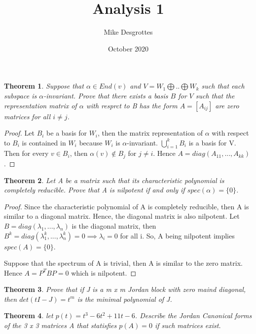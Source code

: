 \documentclass{article}
\title{Analysis 1}
\author{Mike Desgrottes}
\date{October 2020}
\theoremstyle{plain}
\newtheorem{theorem}{Theorem}
\theoremstyle{definition}
\begin{document}
\maketitle

\begin{theorem}
	Suppose that $\alpha \in End(v)$ and $V = W_{1}  \bigoplus .. \bigoplus W_{k}$ such that each subspace is $\alpha$-invariant. Prove that there exists a basis $B$ for $V$ such that the representation matrix of $\alpha$ with resprct to B has the form $A = [A_{ij}]$ are zero matrices for all $i \not = j$.


\end{theorem}

\begin{proof}
	Let $B_{i}$ be a basis for $W_{i}$, then the matrix representation of $\alpha$ with respect to $B_{i}$ is contained in $W_{i}$ because $W_{i}$ is $\alpha$-invariant. $\bigcup_{i = 1}^{k} B_{i}$ is a basis for V. Then for every $v \in B_{i}$, then $\alpha(v) \not \in B_{j}$ for $j \not = i$. Hence $A = diag(A_{11},...,A_{kk})$.
\end{proof}

\begin{theorem}
	Let A be a matrix such that its characteristic polynomial is completely reducible. Prove that A is nilpotent if and only if $spec(\alpha) = \{0\}$.
\end{theorem}

\begin{proof}
	Since the characteristic polynomial of A is completely reducible, then A is similar to a diagonal matrix. Hence, the diagonal matrix is also nilpotent. Let $B = diag(\lambda_{1},...,\lambda_{n})$ is the diagonal matrix, then $B^{k} = diag(\lambda_{1}^{k},...,\lambda_{n}^{k}) = 0 \implies \lambda_{i} = 0$ for all i. So, A being nilpotent implies $spec(A) = \{0\}$.

	Suppose that the spectrum of A is trivial, then A is similar to the zero matrix. Hence $A = P^{T}BP = 0$ which is nilpotent. 
\end{proof}

\begin{theorem}
	Prove that if J is a m x m Jordan block with zero maind diagonal, then $det(tI - J) = t^{m}$ is the minimal polynomial of  J.
\end{theorem}
\begin{theorem}
	let $p(t) = t^{3} - 6t^{2} + 11t - 6$. Describe the Jordan Canonical forms of the 3 x 3 matrices A that statisfies $p(A) = 0$ if such matrices exist.
\end{theorem}
\end{document}
